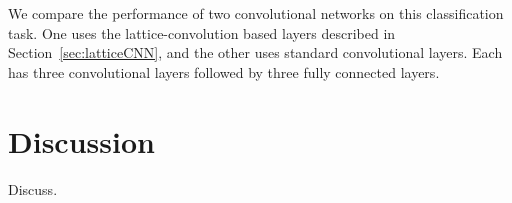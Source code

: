 \documentclass{article}
\begin{document}
We compare the performance of two convolutional networks on this classification
task. One uses the lattice-convolution based layers described in
Section~\ref{sec:latticeCNN}, and the other uses standard convolutional layers.
Each has three convolutional layers followed by three fully connected layers.




\section{Discussion}
Discuss.




\end{document}
